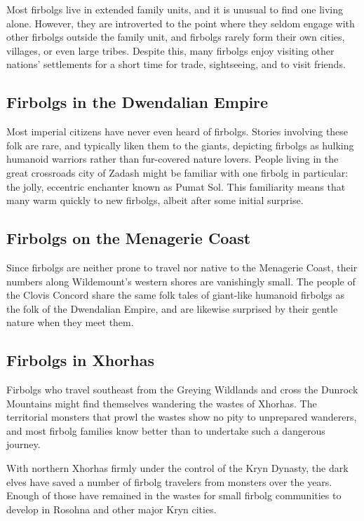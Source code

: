 \documentclass[10pt,a4paper,twoside,bg=print,twocolumn,openany,nodeprecatedcode]{dndbook}
\begin{document}
Most firbolgs live in extended family units, and it is unusual to find one living alone. However, they are introverted to the point where they seldom engage with other firbolgs outside the family unit, and firbolgs rarely form their own cities, villages, or even large tribes. Despite this, many firbolgs enjoy visiting other nations' settlements for a short time for trade, sightseeing, and to visit friends.

\subsection{Firbolgs in the Dwendalian Empire}
Most imperial citizens have never even heard of firbolgs. Stories involving these folk are rare, and typically liken them to the giants, depicting firbolgs as hulking humanoid warriors rather than fur-covered nature lovers. People living in the great crossroads city of Zadash might be familiar with one firbolg in particular: the jolly, eccentric enchanter known as Pumat Sol. This familiarity means that many warm quickly to new firbolgs, albeit after some initial surprise.

\subsection{Firbolgs on the Menagerie Coast}
Since firbolgs are neither prone to travel nor native to the Menagerie Coast, their numbers along Wildemount's western shores are vanishingly small. The people of the Clovis Concord share the same folk tales of giant-like humanoid firbolgs as the folk of the Dwendalian Empire, and are likewise surprised by their gentle nature when they meet them.

\subsection{Firbolgs in Xhorhas}
Firbolgs who travel southeast from the Greying Wildlands and cross the Dunrock Mountains might find themselves wandering the wastes of Xhorhas. The territorial monsters that prowl the wastes show no pity to unprepared wanderers, and most firbolg families know better than to undertake such a dangerous journey.

With northern Xhorhas firmly under the control of the Kryn Dynasty, the dark elves have saved a number of firbolg travelers from monsters over the years. Enough of those have remained in the wastes for small firbolg communities to develop in Rosohna and other major Kryn cities.
\end{document}
